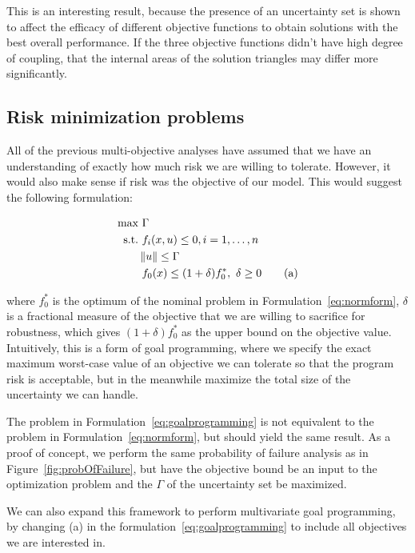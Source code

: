 This is an interesting result, because the presence of an uncertainty set is
shown to affect the efficacy of different objective functions to obtain solutions
with the best overall performance. If the three objective functions didn't
have high degree of coupling, that the internal areas of the solution triangles may differ
more significantly.

\subsection{Risk minimization problems}

All of the previous multi-objective analyses have assumed that we have an
understanding of exactly how much risk we are
willing to tolerate. However, it would also make sense if risk was the objective of our
model. This would suggest the following formulation:

\begin{align*}
    \text{max} &~\Gamma \\
    \text{s.t.}     &~f_i(x,u) \leq 0, i = 1,\ldots,n \\
                    & \left\lVert u\right\rVert \leq \Gamma \\
                    &~f_0(x) \leq (1+\delta)f_0^*,~\delta \geq 0 \tag{a}
    \label{eq:goalprogramming}
\end{align*}

where $f_0^*$ is the optimum of the nominal problem in Formulation~\ref{eq:normform}, $\delta$
is a fractional measure of the objective that we are willing to sacrifice for robustness, which
gives $(1+\delta)f_0^*$ as the upper bound on the objective value. Intuitively,
this is a form of goal programming,
where we specify the exact maximum worst-case value of an objective we can tolerate so that the program
risk is acceptable, but in the meanwhile maximize the total size of the uncertainty we can handle.

The problem in Formulation~\ref{eq:goalprogramming} is not equivalent to the problem in Formulation~\ref{eq:normform},
but should yield the same result. As a proof of concept, we perform the same probability of failure
analysis as in Figure~\ref{fig:probOfFailure}, but have the objective bound be an input to the
optimization problem and the $\Gamma$ of the uncertainty set be maximized.


We can also expand this framework to perform multivariate goal programming,
by changing (a) in the formulation~\ref{eq:goalprogramming} to include all
objectives we are interested in.


